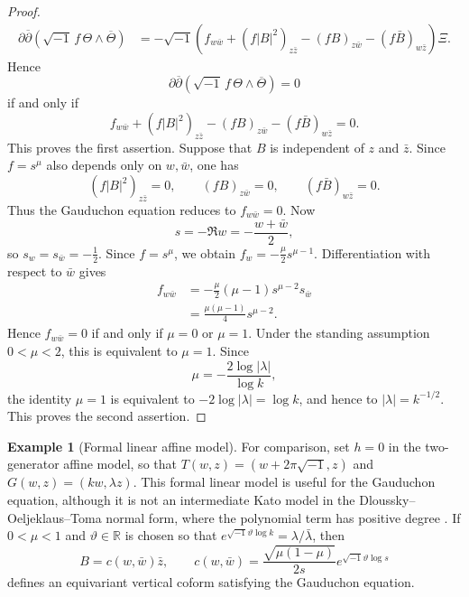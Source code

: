 \documentclass[12pt]{amsart}
\numberwithin{equation}{section}
\theoremstyle{remark}
\theoremstyle{definition}
\newtheorem{example}{Example}
\begin{document}
\begin{proof}
\begin{align*}
\partial\overline{\partial}
\left(
\sqrt{-1}\,f\,\Theta\wedge\overline{\Theta}
\right)
&=
-\sqrt{-1}
\left(
f_{w\bar w}
+
(f|B|^2)_{z\bar z}
-
(fB)_{z\bar w}
-
(f\bar B)_{w\bar z}
\right)\Xi.
\end{align*}
Hence
\begin{equation*}
\partial\overline{\partial}
\left(
\sqrt{-1}\,f\,\Theta\wedge\overline{\Theta}
\right)
=0
\end{equation*}
if and only if
$$
f_{w\bar w}+(f|B|^2)_{z\bar z}-(fB)_{z\bar w}-(f\bar B)_{w\bar z}=0.
$$
This proves the first assertion. 
Suppose that $B$ is independent of $z$ and
$\bar z$. Since $f=s^\mu$ also depends only on $w,\bar w$, one has
\begin{equation*}
(f|B|^2)_{z\bar z}=0,
\qquad
(fB)_{z\bar w}=0,
\qquad
(f\bar B)_{w\bar z}=0.
\end{equation*}
Thus the Gauduchon equation reduces to $f_{w\bar w}=0$. Now
\begin{equation*}
s=-\Re w=-\frac{w+\bar w}{2},
\end{equation*}
so $s_w=s_{\bar w}=-\tfrac12$.
Since $f=s^\mu$, we obtain $f_w=-\frac{\mu}{2}s^{\mu-1}$.
Differentiation with respect to $\bar w$ gives
\begin{align*}
f_{w\bar w}
&=
-\frac{\mu}{2}(\mu-1)s^{\mu-2}s_{\bar w}\\
&=
\frac{\mu(\mu-1)}{4}s^{\mu-2}.
\end{align*}
Hence $f_{w\bar w}=0$ if and only if $\mu=0$ or $\mu=1$.
Under the standing assumption $0<\mu<2$, this is equivalent to $\mu=1$. Since
\begin{equation*}
\mu=-\frac{2\log|\lambda|}{\log k},
\end{equation*}
the identity $\mu=1$ is equivalent to $-2\log|\lambda|=\log k$, and hence to $|\lambda|=k^{-1/2}$.
This proves the second assertion.
\end{proof}


\begin{example}[Formal linear affine model]\label{ex:formal-linear-green}
For comparison, set $h=0$ in the two-generator affine model, so that $T(w,z)=(w+2\pi\sqrt{-1},z)$ and $G(w,z)=(kw,\lambda z)$. This formal linear model is useful for the Gauduchon equation, although it is not an intermediate Kato model in the Dloussky--Oeljeklaus--Toma normal form, where the polynomial term has positive degree \cite[Section~3]{oeljeklaus-toma-moduli}. If $0<\mu<1$ and $\vartheta\in\mathbb R$ is chosen so that $e^{\sqrt{-1}\vartheta\log k}=\lambda/\bar\lambda$, then
$$B=c(w,\bar w)\bar z,\qquad c(w,\bar w)=\frac{\sqrt{\mu(1-\mu)}}{2s}e^{\sqrt{-1}\vartheta\log s}$$
defines an equivariant vertical coform satisfying the Gauduchon equation.
\end{example}
\end{document}
